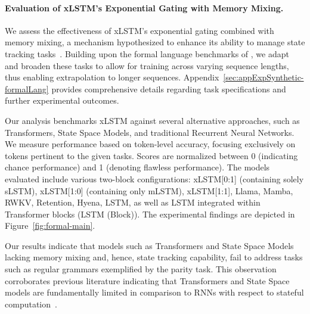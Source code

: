 \paragraph{Evaluation of xLSTM's Exponential Gating with Memory Mixing.} We assess the effectiveness of xLSTM's exponential gating combined with memory mixing, a mechanism hypothesized to enhance its ability to manage state tracking tasks~\citep{Merrill:24, Merrill:23}. Building upon the formal language benchmarks of \citet{Deletang:23}, we adapt and broaden these tasks to allow for training across varying sequence lengths, thus enabling extrapolation to longer sequences. Appendix~\ref{sec:appExpSynthetic-formalLang} provides comprehensive details regarding task specifications and further experimental outcomes. 

Our analysis benchmarks xLSTM against several alternative approaches, such as Transformers, State Space Models, and traditional Recurrent Neural Networks. We measure performance based on token-level accuracy, focusing exclusively on tokens pertinent to the given tasks. Scores are normalized between 0 (indicating chance performance) and 1 (denoting flawless performance). The models evaluated include various two-block configurations: xLSTM[0:1] (containing solely sLSTM), xLSTM[1:0] (containing only mLSTM), xLSTM[1:1], Llama, Mamba, RWKV, Retention, Hyena, LSTM, as well as LSTM integrated within Transformer blocks (LSTM (Block)). The experimental findings are depicted in Figure~\ref{fig:formal-main}.

Our results indicate that models such as Transformers and State Space Models lacking memory mixing and, hence, state tracking capability, fail to address tasks such as regular grammars exemplified by the parity task. This observation corroborates previous literature indicating that Transformers and State Space models are fundamentally limited in comparison to RNNs with respect to stateful computation~\citep{Merrill:24, Merrill:23, Deletang:23}.

